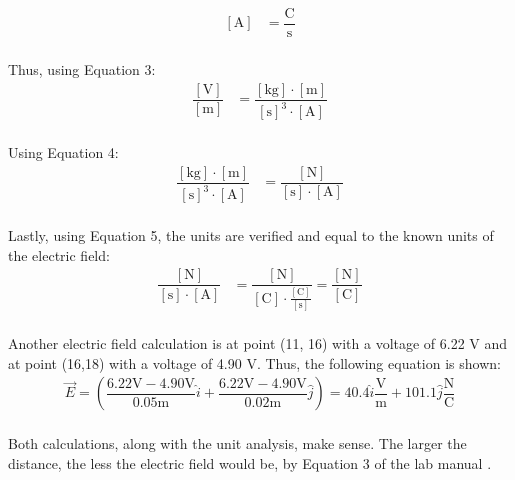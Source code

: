 \documentclass [12pt, letterpaper, twoside] {article}
\begin{document}
\begin{enumerate}
\begin{equation}
  \begin{split}
    [\text{A}] &= \dfrac{\text{C}}{\text{s}} \\
  \end{split}
\end{equation}

Thus, using Equation 3:
\begin{equation*}
  \begin{split}
    \dfrac{[\text{V}]}{[\text{m}]} &= \dfrac{[\text{kg}]\cdot{[\text{m}]}}{[\text{s}]^3\cdot{[\text{A}]}} \\
  \end{split}
\end{equation*}

Using Equation 4:
\begin{equation*}
  \begin{split} 
    \dfrac{[\text{kg}]\cdot{[\text{m}]}}{[\text{s}]^3\cdot{[\text{A}]}} &= \dfrac{[\text{N}]}{[\text{s}]\cdot[\text{A}]} \\
  \end{split}
\end{equation*}

Lastly, using Equation 5, the units are verified and equal to the known units of the electric field:
\begin{equation*}
  \begin{split}
    \dfrac{[\text{N}]}{[\text{s}]\cdot[\text{A}]} &= \dfrac{[\text{N}]}{[\text{C}]\cdot\tfrac{[\text{C}]}{[\text{s}]}} = \dfrac{[\text{N}]}{[\text{C}]} \\
  \end{split}
\end{equation*}

Another electric field calculation is at point (11, 16) with a voltage of 6.22 V and at point (16,18) with a voltage of 4.90 V. Thus, the following equation is shown:
\begin{equation*}
  \begin{split} 
    \vec{E} = \left(\dfrac{6.22\text{V}-4.90\text{V}}{0.05\text{m}}\hat{i}+\dfrac{6.22\text{V}-4.90\text{V}}{0.02\text{m}}\hat{j}\right) = 40.4\hat{i}\dfrac{\text{V}}{\text{m}} + 101.1\hat{j}\dfrac{\text{N}}{\text{C}} \\
  \end{split}
\end{equation*}

Both calculations, along with the unit analysis, make sense. The larger the distance, the less the electric field would be, by Equation 3 of the lab manual \cite{labManual}.


\end{enumerate}
\end{document}
